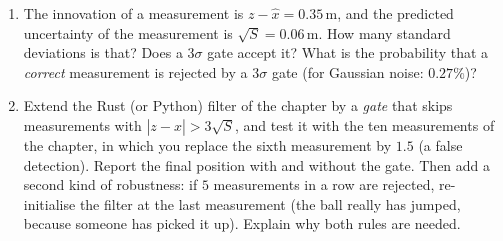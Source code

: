 \begin{enumerate}[label=\textbf{\thechapter.\arabic*}]
  \item The innovation of a measurement is $z-\hat x=0.35$\,m, and the predicted uncertainty of the measurement is $\sqrt S=0.06$\,m. How many standard deviations is that? Does a $3\sigma$ gate accept it? What is the probability that a \emph{correct} measurement is rejected by a $3\sigma$ gate (for Gaussian noise: $0.27\%$)?
  \item[\textbf{\thechapter.10}$\star$] Extend the Rust (or Python) filter of the chapter by a \emph{gate} that skips measurements with $|z-\hat x|>3\sqrt S$, and test it with the ten measurements of the chapter, in which you replace the sixth measurement by $1.5$ (a false detection). Report the final position with and without the gate. Then add a second kind of robustness: if $5$ measurements in a row are rejected, re-initialise the filter at the last measurement (the ball really has jumped, because someone has picked it up). Explain why both rules are needed.
\end{enumerate}
